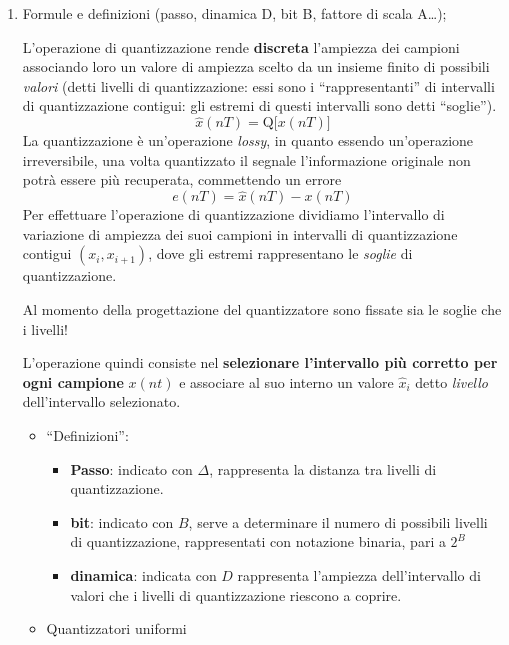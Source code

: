 \documentclass[
]{article}
\providecommand{\tightlist}{%
  \setlength{\itemsep}{0pt}\setlength{\parskip}{0pt}}
\begin{document}
\begin{enumerate}
\def\labelenumi{\arabic{enumi}.}
\setcounter{enumi}{29}
\item
  Formule e definizioni (passo, dinamica D, bit B, fattore di scala
  A\ldots);

  L'operazione di quantizzazione rende \textbf{discreta} l'ampiezza dei
  campioni associando loro un valore di ampiezza scelto da un insieme
  finito di possibili \emph{valori} (detti livelli di quantizzazione:
  essi sono i ``rappresentanti'' di intervalli di quantizzazione
  contigui: gli estremi di questi intervalli sono detti ``soglie''). \[
  \hat{x}(nT) = \text{Q}\Big[x(nT)\Big]
  \] La quantizzazione è un'operazione \emph{lossy}, in quanto essendo
  un'operazione irreversibile, una volta quantizzato il segnale
  l'informazione originale non potrà essere più recuperata, commettendo
  un errore \[
  e(nT)=\hat{x}(nT)-x(nT)
  \] Per effettuare l'operazione di quantizzazione dividiamo
  l'intervallo di variazione di ampiezza dei suoi campioni in intervalli
  di quantizzazione contigui \((x_i, x_{i+1})\), dove gli estremi
  rappresentano le \emph{soglie} di quantizzazione.

  Al momento della progettazione del quantizzatore sono fissate sia le
  soglie che i livelli!

  L'operazione quindi consiste nel \textbf{selezionare l'intervallo più
  corretto per ogni campione} \(x(nt)\) e associare al suo interno un
  valore \(\hat{x}_i\) detto \emph{livello} dell'intervallo selezionato.

  \begin{itemize}
  \item
    ``Definizioni'':

    \begin{itemize}
    \tightlist
    \item
      \textbf{Passo}: indicato con \(\Delta\), rappresenta la distanza
      tra livelli di quantizzazione.
    \item
      \textbf{bit}: indicato con \(B\), serve a determinare il numero di
      possibili livelli di quantizzazione, rappresentati con notazione
      binaria, pari a \(2^{B}\)
    \item
      \textbf{dinamica}: indicata con \(D\) rappresenta l'ampiezza
      dell'intervallo di valori che i livelli di quantizzazione riescono
      a coprire.
    \end{itemize}
  \item
    Quantizzatori uniformi


\end{itemize}
\end{enumerate}
\end{document}
